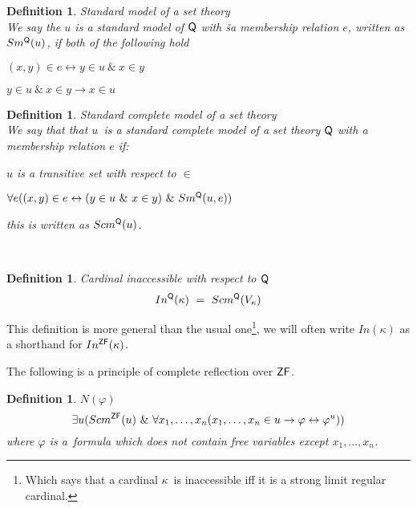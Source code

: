 \documentclass[12pt,a4paper]{article}
\newtheorem{definition}[theorem]{Definition}
\renewcommand{\iff}{\leftrightarrow}
\newcommand{\then}{\rightarrow}
\newcommand{\bce}{\begin{compactenum}}
\newcommand{\ece}{\end{compactenum}}
\begin{document}
\begin{definition}{Standard model of a set theory}\\
We say the $u$ is a standard model of $\sf{Q}$ with ša membership relation $e$, written as $Sm^{\sf{Q}}(u)$, if both of the following hold
\bce[(i)]
\item $(x, y) \in e \iff y \in u\ \&\ x \in y$
\item $y \in u\ \&\ x \in y \then x \in u$
\ece
\end{definition}
\begin{definition}{Standard complete model of a set theory}\\
We say that that $u$ is a standard complete model of a set theory $\sf{Q}$ with a membership relation $e$ if:
\bce[(i)]
\item $u$ is a transitive set with respect to $\in$
\item $\forall e ((x, y) \in e \iff (y \in u\ \&\ x \in y)\ \&\ Sm^{\sf{Q}}(u, e))$
\ece
this is written as $Scm^{\sf{Q}}(u)$.
\end{definition}


\

\begin{definition}{Cardinal inaccessible with respect to $\sf{Q}$}\label{def:levy_inaccessible_q}
\begin{equation}
In^{\sf{Q}}(\kappa)\ =\ Scm^{\sf{Q}}(V_\kappa)
\end{equation}
\end{definition}

This definition is more general than the usual one\footnote{Which says that a cardinal $\kappa$ is inaccessible iff it is a strong limit regular cardinal.}, we will often write $In(\kappa)$ as a shorthand for $In^{\sf{ZF}}(\kappa)$.

The following is a principle of complete reflection over $\sf{ZF}$.
\begin{definition}{$N(\varphi)$}
\begin{equation}
\exists u (Scm^{\sf{ZF}}(u)\ \&\ \forall x_1, \ldots , x_n (x_1, \ldots , x_n \in u \then \varphi \iff \varphi^{u}))
\end{equation}
where $\varphi$ is a~formula which does not contain free variables except $x_1, \ldots , x_n$.
\end{definition}
\end{document}
